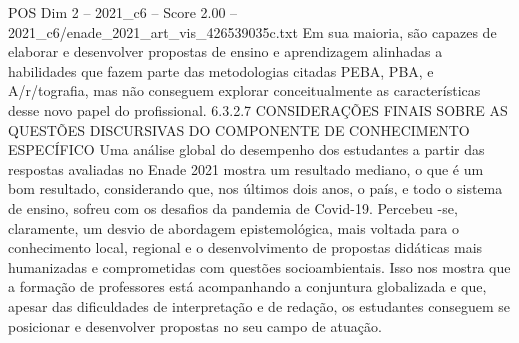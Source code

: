 \begin{textsample}{POS Dim 2 – 2021\_c6 – Score 2.00 – 2021\_c6/enade\_2021\_art\_vis\_426539035c.txt}
Em sua maioria, são capazes de elaborar e desenvolver propostas de ensino e aprendizagem alinhadas a habilidades que fazem parte das metodologias citadas PEBA, PBA, e A/r/tografia, mas não conseguem explorar conceitualmente as características desse novo papel do profissional. 6.3.2.7 CONSIDERAÇÕES FINAIS SOBRE AS QUESTÕES DISCURSIVAS DO COMPONENTE DE CONHECIMENTO ESPECÍFICO Uma análise global do desempenho dos estudantes a partir das respostas avaliadas no Enade 2021 mostra um resultado mediano, o que é um bom resultado, considerando que, nos últimos dois anos, o país, e todo o sistema de ensino, sofreu com os desafios da pandemia de Covid-19.
Percebeu -se, claramente, um desvio de abordagem epistemológica, mais voltada para o conhecimento local, regional e o desenvolvimento de propostas didáticas mais humanizadas e comprometidas com questões socioambientais.
Isso nos mostra que a formação de professores está acompanhando a conjuntura globalizada e que, apesar das dificuldades de interpretação e de redação, os estudantes conseguem se posicionar e desenvolver propostas no seu campo de atuação.

\end{textsample}
